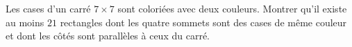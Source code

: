 Les cases d'un carré $7 \times 7$ sont coloriées avec deux couleurs. Montrer qu'il existe au moins $21$ rectangles dont les quatre sommets sont des cases de même couleur et dont les côtés sont parallèles à ceux du carré.
